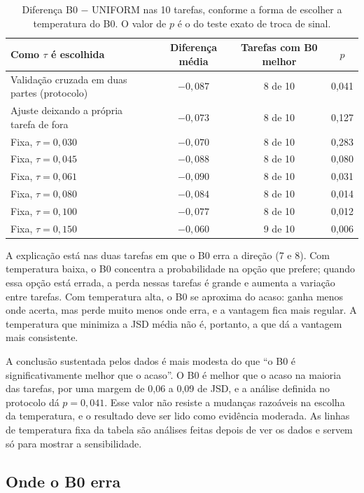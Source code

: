 \documentclass[12pt,oneside,a4paper,chapter=TITLE,english,brazil]{abntex2}
\begin{document}
\begin{table}[htb]
\centering
\caption{Diferença B0 $-$ UNIFORM nas 10 tarefas, conforme a forma de escolher a temperatura do B0. O valor de $p$ é o do teste exato de troca de sinal.}
\label{tab:sensib}
\footnotesize
\begin{tabular}{@{}lccc@{}}
\toprule
\textbf{Como $\tau$ é escolhida} & \textbf{Diferença média} & \textbf{Tarefas com B0 melhor} & \textbf{$p$} \\
\midrule
Validação cruzada em duas partes (protocolo) & $-0{,}087$ & 8 de 10 & 0,041 \\
Ajuste deixando a própria tarefa de fora & $-0{,}073$ & 8 de 10 & 0,127 \\
\midrule
Fixa, $\tau=0{,}030$ & $-0{,}070$ & 8 de 10 & 0,283 \\
Fixa, $\tau=0{,}045$ & $-0{,}088$ & 8 de 10 & 0,080 \\
Fixa, $\tau=0{,}061$ & $-0{,}090$ & 8 de 10 & 0,031 \\
Fixa, $\tau=0{,}080$ & $-0{,}084$ & 8 de 10 & 0,014 \\
Fixa, $\tau=0{,}100$ & $-0{,}077$ & 8 de 10 & 0,012 \\
Fixa, $\tau=0{,}150$ & $-0{,}060$ & 9 de 10 & 0,006 \\
\bottomrule
\end{tabular}
\end{table}

A explicação está nas duas tarefas em que o B0 erra a direção (7 e 8). Com temperatura baixa, o B0 concentra a probabilidade na opção que prefere; quando essa opção está errada, a perda nessas tarefas é grande e aumenta a variação entre tarefas. Com temperatura alta, o B0 se aproxima do acaso: ganha menos onde acerta, mas perde muito menos onde erra, e a vantagem fica mais regular. A temperatura que minimiza a JSD média não é, portanto, a que dá a vantagem mais consistente.

A conclusão sustentada pelos dados é mais modesta do que ``o B0 é significativamente melhor que o acaso''. O B0 é melhor que o acaso na maioria das tarefas, por uma margem de 0,06 a 0,09 de JSD, e a análise definida no protocolo dá $p=0{,}041$. Esse valor não resiste a mudanças razoáveis na escolha da temperatura, e o resultado deve ser lido como evidência moderada. As linhas de temperatura fixa da tabela são análises feitas depois de ver os dados e servem só para mostrar a sensibilidade.

\subsection{Onde o B0 erra}
\end{document}
